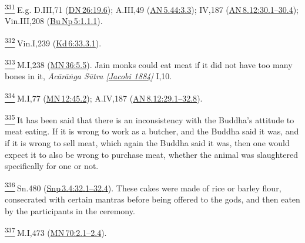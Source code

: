 \label{footprints_split_024.html_fn331}
\hyperref[footprints_split_011.htmlux5cux23fnref331]{\textsuperscript{331}} E.g.
D.III,71
(\href{https://suttacentral.net/dn26/en/sujato\#19.6}{DN\,26:19.6});
A.III,49
(\href{https://suttacentral.net/an5.44/en/sujato\#3.3}{AN\,5.44:3.3});
IV,187
(\href{https://suttacentral.net/an8.12/en/sujato\#30.1}{AN\,8.12:30.1--30.4});
Vin.III,208
(\href{https://suttacentral.net/pli-tv-bu-vb-np5/en/brahmali?\#1.1.1}{Bu\,Np\,5:1.1.1}).

\label{footprints_split_024.html_fn332}
\hyperref[footprints_split_011.htmlux5cux23fnref332]{\textsuperscript{332}} Vin.I,239
(\href{https://suttacentral.net/pli-tv-kd6/en/brahmali?\#33.3.1}{Kd\,6:33.3.1}).

\label{footprints_split_024.html_fn333}
\hyperref[footprints_split_011.htmlux5cux23fnref333]{\textsuperscript{333}} M.I,238
(\href{https://suttacentral.net/mn36/en/sujato\#5.5}{MN\,36:5.5}). Jain
monks could eat meat if it did not have too many bones in it,
\emph{{Ācārāṅga Sūtra
{{[}\hyperref[footprints_split_022.htmlux5cux23Jacobiux5cux25201884]{Jacobi
1884}{]}}}} I,10.

\label{footprints_split_024.html_fn334}
\hyperref[footprints_split_011.htmlux5cux23fnref334]{\textsuperscript{334}} M.I,77
(\href{https://suttacentral.net/mn12/en/sujato\#45.2}{MN\,12:45.2});
A.IV,187
(\href{https://suttacentral.net/an8.12/en/sujato\#29.1}{AN\,8.12:29.1--32.8}).

\label{footprints_split_024.html_fn335}
\hyperref[footprints_split_011.htmlux5cux23fnref335]{\textsuperscript{335}} It
has been said that there is an inconsistency with the Buddha's attitude
to meat eating. If it is wrong to work as a butcher, and the Buddha said
it was, and if it is wrong to sell meat, which again the Buddha said it
was, then one would expect it to also be wrong to purchase meat, whether
the animal was slaughtered specifically for one or not.

\label{footprints_split_024.html_fn336}
\hyperref[footprints_split_011.htmlux5cux23fnref336]{\textsuperscript{336}} Sn.480
(\href{https://suttacentral.net/snp3.4/en/sujato\#32.1}{Snp\,3.4:32.1--32.4}).
These cakes were made of rice or barley flour, consecrated with certain
mantras before being offered to the gods, and then eaten by the
participants in the ceremony.

\label{footprints_split_024.html_fn337}
\hyperref[footprints_split_011.htmlux5cux23fnref337]{\textsuperscript{337}} M.I,473
(\href{https://suttacentral.net/mn70/en/sujato\#2.1}{MN\,70:2.1--2.4}).

